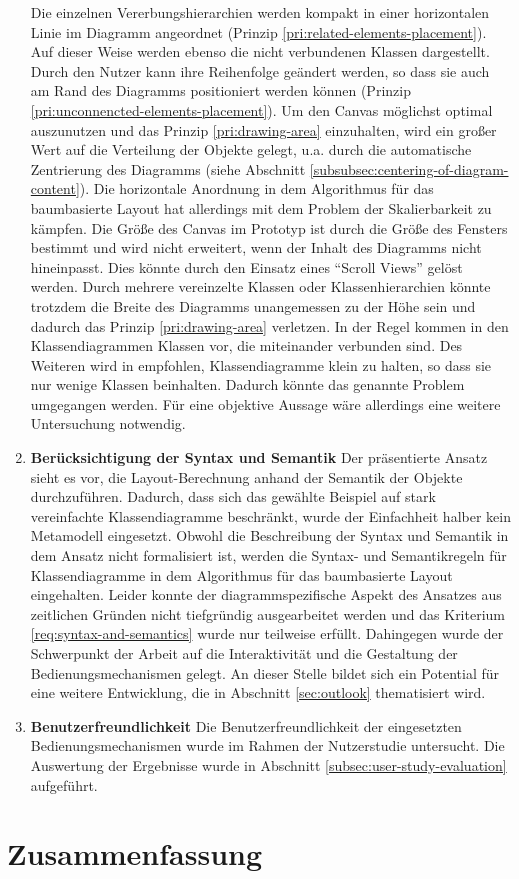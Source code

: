 \begin{enumerate}[label={K.\arabic*}]
Die einzelnen Vererbungshierarchien werden kompakt in einer horizontalen Linie im Diagramm angeordnet (Prinzip \ref{pri:related-elements-placement}). Auf dieser Weise werden ebenso die nicht verbundenen Klassen dargestellt. Durch den Nutzer kann ihre Reihenfolge geändert werden, so dass sie auch am Rand des Diagramms positioniert werden können (Prinzip \ref{pri:unconnencted-elements-placement}). Um den Canvas möglichst optimal auszunutzen und das Prinzip \ref{pri:drawing-area} einzuhalten, wird ein großer Wert auf die Verteilung der Objekte gelegt, u.a. durch die automatische Zentrierung des Diagramms (siehe Abschnitt \ref{subsubsec:centering-of-diagram-content}). Die horizontale Anordnung in dem Algorithmus für das baumbasierte Layout hat allerdings mit dem Problem der Skalierbarkeit zu kämpfen. Die Größe des Canvas im Prototyp ist durch die Größe des Fensters bestimmt und wird nicht erweitert, wenn der Inhalt des Diagramms nicht hineinpasst. Dies könnte durch den Einsatz eines \enquote{Scroll Views} gelöst werden. Durch mehrere vereinzelte Klassen oder Klassenhierarchien könnte trotzdem die Breite des Diagramms unangemessen zu der Höhe sein und dadurch das Prinzip \ref{pri:drawing-area} verletzen. In der Regel kommen in den Klassendiagrammen Klassen vor, die miteinander verbunden sind. Des Weiteren wird in \cite{Ambler02Agile} empfohlen, Klassendiagramme klein zu halten, so dass sie nur wenige Klassen beinhalten. Dadurch könnte das genannte Problem umgegangen werden. Für eine objektive Aussage wäre allerdings eine weitere Untersuchung notwendig.

\item
\label{eval:syntax-and-semantics}
\textbf{Berücksichtigung der Syntax und Semantik}
Der präsentierte Ansatz sieht es vor, die Layout-Berechnung anhand der Semantik der Objekte durchzuführen. Dadurch, dass sich das gewählte Beispiel auf stark vereinfachte Klassendiagramme beschränkt, wurde der Einfachheit halber kein Metamodell eingesetzt. Obwohl die Beschreibung der Syntax und Semantik in dem Ansatz nicht formalisiert ist, werden die Syntax- und Semantikregeln für Klassendiagramme in dem Algorithmus für das baumbasierte Layout eingehalten. Leider konnte der diagrammspezifische Aspekt des Ansatzes aus zeitlichen Gründen nicht tiefgründig ausgearbeitet werden und das Kriterium \ref{req:syntax-and-semantics} wurde nur teilweise erfüllt. Dahingegen wurde der Schwerpunkt der Arbeit auf die Interaktivität und die Gestaltung der Bedienungsmechanismen gelegt. An dieser Stelle bildet sich ein Potential für eine weitere Entwicklung, die in Abschnitt \ref{sec:outlook} thematisiert wird.

\item
\label{eval:user-friendly}
\textbf{Benutzerfreundlichkeit}
Die Benutzerfreundlichkeit der eingesetzten Bedienungsmechanismen wurde im Rahmen der Nutzerstudie untersucht. Die Auswertung der Ergebnisse wurde in Abschnitt \ref{subsec:user-study-evaluation} aufgeführt.

\end{enumerate}


\section{Zusammenfassung}
\label{sec:evaluation-summary}
